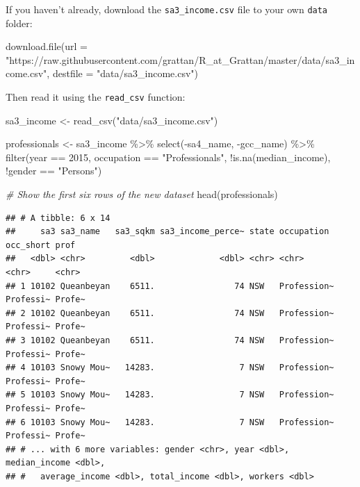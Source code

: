 \documentclass[
]{book}
\newenvironment{Shaded}{\begin{snugshade}}{\end{snugshade}}
\newcommand{\AttributeTok}[1]{\textcolor[rgb]{0.77,0.63,0.00}{#1}}
\newcommand{\CommentTok}[1]{\textcolor[rgb]{0.56,0.35,0.01}{\textit{#1}}}
\newcommand{\DecValTok}[1]{\textcolor[rgb]{0.00,0.00,0.81}{#1}}
\newcommand{\FunctionTok}[1]{\textcolor[rgb]{0.00,0.00,0.00}{#1}}
\newcommand{\NormalTok}[1]{#1}
\newcommand{\OtherTok}[1]{\textcolor[rgb]{0.56,0.35,0.01}{#1}}
\newcommand{\SpecialCharTok}[1]{\textcolor[rgb]{0.00,0.00,0.00}{#1}}
\newcommand{\StringTok}[1]{\textcolor[rgb]{0.31,0.60,0.02}{#1}}
\begin{document}
If you haven't already, download the \texttt{sa3\_income.csv} file to your own \texttt{data} folder:

\begin{Shaded}
\begin{Highlighting}[]
\FunctionTok{download.file}\NormalTok{(}\AttributeTok{url =} \StringTok{"https://raw.githubusercontent.com/grattan/R\_at\_Grattan/master/data/sa3\_income.csv"}\NormalTok{,}
              \AttributeTok{destfile =} \StringTok{"data/sa3\_income.csv"}\NormalTok{)}
\end{Highlighting}
\end{Shaded}

Then read it using the \texttt{read\_csv} function:

\begin{Shaded}
\begin{Highlighting}[]
\NormalTok{sa3\_income }\OtherTok{\textless{}{-}} \FunctionTok{read\_csv}\NormalTok{(}\StringTok{"data/sa3\_income.csv"}\NormalTok{)}

\NormalTok{professionals }\OtherTok{\textless{}{-}}\NormalTok{ sa3\_income }\SpecialCharTok{\%\textgreater{}\%} 
  \FunctionTok{select}\NormalTok{(}\SpecialCharTok{{-}}\NormalTok{sa4\_name, }\SpecialCharTok{{-}}\NormalTok{gcc\_name) }\SpecialCharTok{\%\textgreater{}\%} 
  \FunctionTok{filter}\NormalTok{(year }\SpecialCharTok{==} \DecValTok{2015}\NormalTok{,}
\NormalTok{         occupation }\SpecialCharTok{==} \StringTok{"Professionals"}\NormalTok{,}
         \SpecialCharTok{!}\FunctionTok{is.na}\NormalTok{(median\_income),}
         \SpecialCharTok{!}\NormalTok{gender }\SpecialCharTok{==} \StringTok{"Persons"}\NormalTok{) }

\CommentTok{\# Show the first six rows of the new dataset}
\FunctionTok{head}\NormalTok{(professionals)}
\end{Highlighting}
\end{Shaded}

\begin{verbatim}
## # A tibble: 6 x 14
##     sa3 sa3_name   sa3_sqkm sa3_income_perce~ state occupation  occ_short prof  
##   <dbl> <chr>         <dbl>             <dbl> <chr> <chr>       <chr>     <chr> 
## 1 10102 Queanbeyan    6511.                74 NSW   Profession~ Professi~ Profe~
## 2 10102 Queanbeyan    6511.                74 NSW   Profession~ Professi~ Profe~
## 3 10102 Queanbeyan    6511.                74 NSW   Profession~ Professi~ Profe~
## 4 10103 Snowy Mou~   14283.                 7 NSW   Profession~ Professi~ Profe~
## 5 10103 Snowy Mou~   14283.                 7 NSW   Profession~ Professi~ Profe~
## 6 10103 Snowy Mou~   14283.                 7 NSW   Profession~ Professi~ Profe~
## # ... with 6 more variables: gender <chr>, year <dbl>, median_income <dbl>,
## #   average_income <dbl>, total_income <dbl>, workers <dbl>
\end{verbatim}
\end{document}
